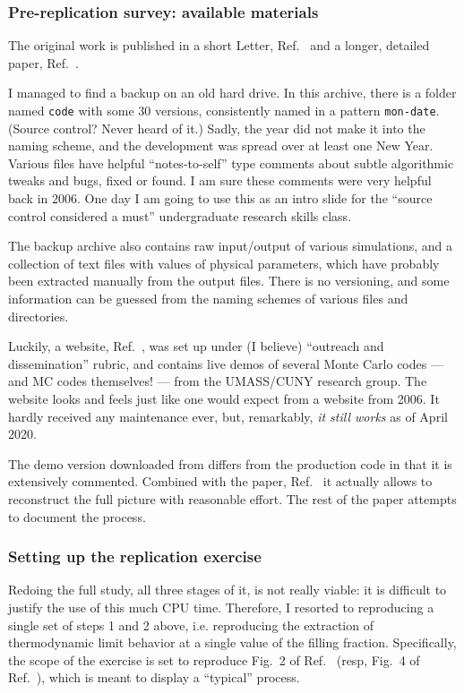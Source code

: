 \subsubsection{Pre-replication survey: available materials}
The original work is published in a short Letter, Ref.\ \cite{PRL:2006} and
a longer, detailed paper, Ref.\ \cite{NJP:2006}.

I managed to find a backup on an old hard drive. In this archive, 
there is a folder named \texttt{code} with some 30 versions,
consistently named in a pattern \texttt{mon-date}. (Source control? Never
heard of it.) Sadly, the year did not make it into the naming scheme, and the
development was spread over at least one New Year. 
Various files have helpful ``notes-to-self'' type comments
about subtle algorithmic  tweaks and bugs, fixed or found. I am sure these
comments were very helpful back in 2006. 
One day I am going to use this as an intro slide for the
``source control considered a must'' undergraduate research skills class.

The backup archive also contains raw input/output of various simulations, and
a collection of text files with values of physical parameters, which have
probably been extracted manually from the output files. There is no versioning,
and some information can be guessed from the naming schemes of various files
and directories. 

Luckily, a website, Ref.\ \cite{MCWA}, was set up under (I believe) ``outreach and
dissemination'' rubric, and contains live demos of several
Monte Carlo codes --- and MC codes themselves! --- from the UMASS/CUNY research group. 
The website looks and feels just like one would expect from a website from 2006.
It hardly received any maintenance ever, but, remarkably, 
\emph{it still works} as of April 2020. 

The demo version downloaded from \cite{MCWA} differs from the production code
in that it is extensively commented. Combined with the paper, Ref.\ \cite{NJP:2006}
it actually allows to reconstruct the full picture with reasonable effort.
The rest of the paper attempts to document the process. 


\subsubsection{Setting up the replication exercise}

Redoing the full study, all three stages of it, is not really viable:
it is difficult to justify the use of this much CPU time. Therefore, I resorted
to reproducing a single set of steps 1 and 2 above, i.e. reproducing the
extraction of thermodynamic limit behavior at a single value of the filling
fraction. Specifically, the scope of the exercise is set to reproduce Fig.\ 2
of Ref.\ \cite{PRL:2006} (resp, Fig.\ 4 of Ref.\ \cite{NJP:2006}), which is
meant to display a ``typical'' process. 

